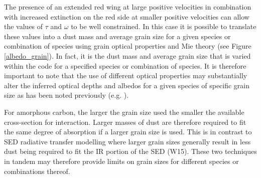 \documentclass[useAMS,usenatbib,usegraphicx]{mnras}
\begin{document}

The presence of an extended red wing at large positive velocities in 
combination with increased extinction on the red side at smaller positive 
velocities can allow the values of $\tau$ and $\omega$ to be well 
constrained.  In this case it is possible to translate these values into a 
dust mass and average grain size for a given species or combination of 
species using grain optical properties and Mie theory (see Figure 
\ref{albedo_grain}).  In fact, it is the dust mass and average grain size 
that is varied within the code for a specified species or combination of 
species.  It is therefore important to note that the use of different 
optical properties may substantially alter the inferred optical depths and 
albedos for a given species of specific grain size as has been noted 
previously (e.g. \citet{Owen2015}).



For amorphous carbon, the larger the grain size used the smaller the available cross-section for interaction.  Larger masses of dust 
are therefore required to fit the same degree of absorption if a larger 
grain size is used.  This is in contrast to SED radiative transfer 
modelling where larger grain sizes generally result in less dust being 
required to fit the IR portion of the SED (W15).  These two techniques in 
tandem may therefore provide limits on grain sizes for different 
species or combinations thereof.
\end{document}
